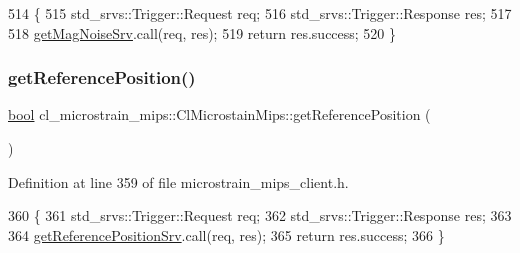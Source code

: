 \begin{DoxyCode}
514     \{
515         std\_srvs::Trigger::Request req;
516         std\_srvs::Trigger::Response res;
517 
518         \hyperlink{classcl__microstrain__mips_1_1ClMicrostainMips_a858136430bc226e36390517f28687a2a}{getMagNoiseSrv}.call(req, res);
519         \textcolor{keywordflow}{return} res.success;
520     \}
\end{DoxyCode}
\mbox{\label{classcl__microstrain__mips_1_1ClMicrostainMips_a1bb67145e871d3ce3637a713559a0121}} 
\subsubsection{\texorpdfstring{get\+Reference\+Position()}{getReferencePosition()}}
{\footnotesize\ttfamily \hyperlink{classbool}{bool} cl\+\_\+microstrain\+\_\+mips\+::\+Cl\+Microstain\+Mips\+::get\+Reference\+Position (\begin{DoxyParamCaption}{ }\end{DoxyParamCaption})\hspace{0.3cm}{\ttfamily [inline]}}



Definition at line 359 of file microstrain\+\_\+mips\+\_\+client.\+h.


\begin{DoxyCode}
360     \{
361         std\_srvs::Trigger::Request req;
362         std\_srvs::Trigger::Response res;
363 
364         \hyperlink{classcl__microstrain__mips_1_1ClMicrostainMips_a1f9b56f826c67a2e1d8a33e0879053bc}{getReferencePositionSrv}.call(req, res);
365         \textcolor{keywordflow}{return} res.success;
366     \}
\end{DoxyCode}
\mbox{\label{classcl__microstrain__mips_1_1ClMicrostainMips_acbb92f93e42a2c304d450cc30c0e992f}} 
